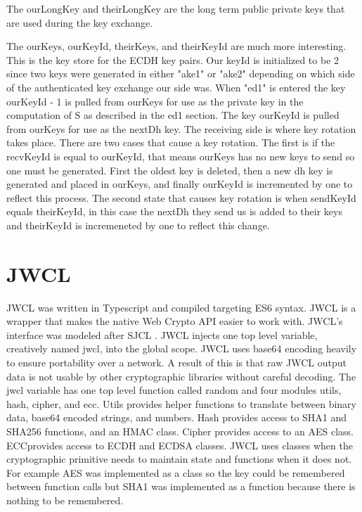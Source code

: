 The ourLongKey and theirLongKey are the long term public private keys that are used during the key exchange. 


The ourKeys, ourKeyId, theirKeys, and theirKeyId are much more interesting. This is the key store for the ECDH key pairs. Our keyId is initialized to be 2 since two keys were generated in either "ake1" or "ake2" depending on which side of the authenticated key exchange our side was. When "ed1" is entered the key ourKeyId - 1 is pulled from ourKeys for use as the private key in the computation of S as described in the ed1 section. The key ourKeyId is pulled from ourKeys for use as the nextDh key. The receiving side is where key rotation takes place. There are two cases that cause a key rotation. The first is if the recvKeyId is equal to ourKeyId, that means ourKeys has no new keys to send so one must be generated. First the oldest key is deleted, then a new dh key is generated and placed in ourKeys, and finally ourKeyId is incremented by one to reflect this process. The second state that causes key rotation is when sendKeyId equals theirKeyId, in this case the nextDh they send us is added to their keys and theirKeyId is incremeneted by one to reflect this change.


\section{JWCL}


JWCL was written in Typescript and compiled targeting ES6 syntax. JWCL is a wrapper that makes the native Web Crypto API easier to work with. JWCL's interface was modeled after SJCL \cite{sjcl-library}. JWCL injects one top level variable, creatively named jwcl, into the global scope. JWCL uses base64 encoding heavily to ensure portability over a network. A result of this is  that raw JWCL output data is not usable by other cryptographic libraries without careful decoding. The jwcl variable has one top level function called random and four modules utils, hash, cipher, and ecc. Utils provides helper functions to translate between binary data, base64 encoded strings, and numbers. Hash provides access to SHA1 and SHA256 functions, and an HMAC class. Cipher provides access to an AES class. ECCprovides access to ECDH and ECDSA classes. JWCL uses classes when the cryptographic primitive needs to maintain state and functions when it does not. For example AES was implemented as a class so the key could be remembered between function calls but SHA1 was implemented as a function because there is nothing to be remembered. 


